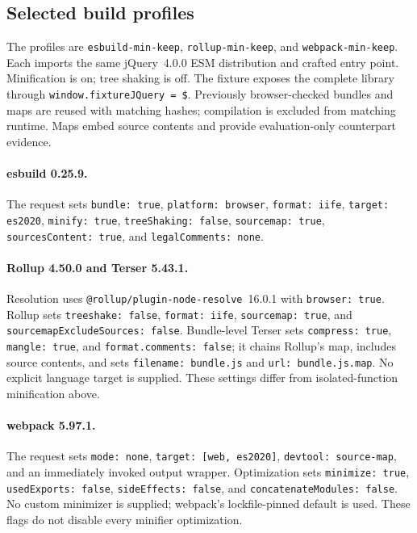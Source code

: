 \subsection{Selected build profiles}
The profiles are \texttt{esbuild-min-keep}, \texttt{rollup-min-keep}, and \texttt{webpack-min-keep}. Each imports the same jQuery~4.0.0 ESM distribution and crafted entry point. Minification is on; tree shaking is off. The fixture exposes the complete library through \texttt{window.fixtureJQuery = \$}. Previously browser-checked bundles and maps are reused with matching hashes; compilation is excluded from matching runtime. Maps embed source contents and provide evaluation-only counterpart evidence.

\begin{sloppypar}
\paragraph{esbuild 0.25.9.}
The request sets \texttt{bundle: true}, \texttt{platform: browser}, \texttt{format: iife}, \texttt{target: es2020}, \texttt{minify: true}, \texttt{treeShaking: false}, \texttt{sourcemap: true}, \texttt{sourcesContent: true}, and \texttt{legalComments: none}.

\paragraph{Rollup 4.50.0 and Terser 5.43.1.}
Resolution uses \nolinkurl{@rollup/plugin-node-resolve}~16.0.1 with \texttt{browser: true}. Rollup sets \texttt{treeshake: false}, \texttt{format: iife}, \texttt{sourcemap: true}, and \texttt{sourcemapExcludeSources: false}. Bundle-level Terser sets \texttt{compress: true}, \texttt{mangle: true}, and \texttt{format.comments: false}; it chains Rollup's map, includes source contents, and sets \texttt{filename: bundle.js} and \texttt{url: bundle.js.map}. No explicit language target is supplied. These settings differ from isolated-function minification above.

\paragraph{webpack 5.97.1.}
The request sets \texttt{mode: none}, \texttt{target: [web, es2020]}, \texttt{devtool: source-map}, and an immediately invoked output wrapper. Optimization sets \texttt{minimize: true}, \texttt{usedExports: false}, \texttt{sideEffects: false}, and \texttt{concatenateModules: false}. No custom minimizer is supplied; webpack's lockfile-pinned default is used. These flags do not disable every minifier optimization.
\end{sloppypar}


